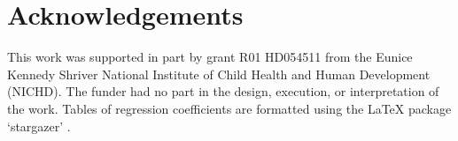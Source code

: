 \documentclass[11pt]{article}
\begin{document}
\section*{Acknowledgements}

This work was supported in part by grant R01 HD054511 from the Eunice Kennedy Shriver National Institute of Child Health and Human Development (NICHD).  The funder had no part in the design, execution, or interpretation of the work.  Tables of regression coefficients are formatted using the LaTeX package `stargazer' \citep{stargazer}.  


\newpage


\end{document}
